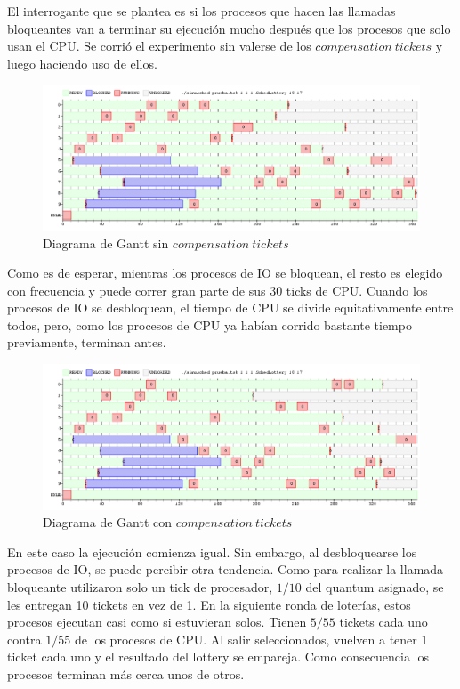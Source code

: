 \documentclass[11pt, a4paper, twoside]{article}
\begin{document}
El interrogante que se plantea es si los procesos que hacen las llamadas bloqueantes van a terminar su ejecución mucho después que los procesos que solo usan el CPU. Se corrió el experimento sin valerse de los $compensation\ tickets$ y luego haciendo uso de ellos.

\begin{figure}[H]
\centering
\includegraphics[width=\textwidth]{../experimentacion/ej10-compensation/gant-sin.png}
\caption{Diagrama de Gantt sin $compensation\ tickets$}
\end{figure}

Como es de esperar, mientras los procesos de IO se bloquean, el resto es elegido con frecuencia y puede correr gran parte de sus 30 ticks de CPU. Cuando los procesos de IO se desbloquean, el tiempo de CPU se divide equitativamente entre todos, pero, como los procesos de CPU ya habían corrido bastante tiempo previamente, terminan antes.

\begin{figure}[H]
\centering
\includegraphics[width=\textwidth]{../experimentacion/ej10-compensation/gant-con.png}
\caption{Diagrama de Gantt con $compensation\ tickets$}
\end{figure}

En este caso la ejecución comienza igual. Sin embargo, al desbloquearse los procesos de IO, se puede percibir otra tendencia. Como para realizar la llamada bloqueante utilizaron solo un tick de procesador, $1/10$ del quantum asignado, se les entregan 10 tickets en vez de 1. En la siguiente ronda de loterías, estos procesos ejecutan casi como si estuvieran solos. Tienen $5/55$ tickets cada uno contra $1/55$ de los procesos de CPU. Al salir seleccionados, vuelven a tener 1 ticket cada uno y el resultado del lottery se empareja. Como consecuencia los procesos terminan más cerca unos de otros.
\end{document}
